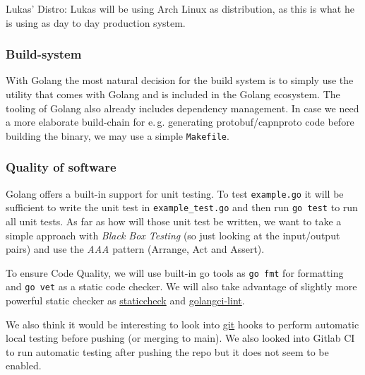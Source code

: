 \documentclass[a4paper,english,10pt,NET]{tumarticle}
\renewcommand{\eg}{\mbox{e.\,g.}\xspace} %
\begin{document}
Lukas' Distro:
Lukas will be using Arch Linux as distribution, as this is what he is using as day to day production system.

\subsubsection{Build-system}
With Golang the most natural decision for the build system is to simply use the utility that comes with Golang and is included in the Golang ecosystem.
The tooling of Golang also already includes dependency management.
In case we need a more elaborate build-chain for \eg generating protobuf/capnproto code before building the binary, we may use a simple \texttt{Makefile}.

\subsubsection{Quality of software}
Golang offers a built-in support for unit testing. To test \verb|example.go| it will be sufficient to write the unit test in \verb|example_test.go| and then run \verb|go test| to run all unit tests. As far as how will those unit test be written, we want to take a simple approach with \textit{Black Box Testing} (so just looking at the input/output pairs) and use the \textit{AAA} pattern (Arrange, Act and Assert).

To ensure Code Quality, we will use built-in go tools as \verb|go fmt| for formatting and \verb|go vet| as a static code checker. We will also take advantage of slightly more powerful static checker as \href{https://staticcheck.dev/}{staticcheck} and \href{https://github.com/golangci/golangci-lint}{golangci-lint}.

We also think it would be interesting to look into \href{https://git-scm.com/book/en/v2/Customizing-Git-Git-Hooks}{git} hooks to perform automatic local testing before pushing (or merging to main). We also looked into Gitlab CI to run automatic testing after pushing the repo but it does not seem to be enabled.  

\end{document}
